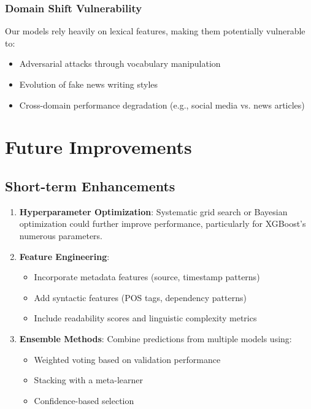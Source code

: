 \documentclass[11pt]{article}
\begin{document}
\subsubsection{Domain Shift Vulnerability}
Our models rely heavily on lexical features, making them potentially vulnerable to:
\begin{itemize}
\item Adversarial attacks through vocabulary manipulation
\item Evolution of fake news writing styles
\item Cross-domain performance degradation (e.g., social media vs. news articles)
\end{itemize}

\section{Future Improvements}

\subsection{Short-term Enhancements}
\begin{enumerate}
\item \textbf{Hyperparameter Optimization}: Systematic grid search or Bayesian optimization could further improve performance, particularly for XGBoost's numerous parameters.

\item \textbf{Feature Engineering}:
   \begin{itemize}
   \item Incorporate metadata features (source, timestamp patterns)
   \item Add syntactic features (POS tags, dependency patterns)
   \item Include readability scores and linguistic complexity metrics
   \end{itemize}

\item \textbf{Ensemble Methods}: Combine predictions from multiple models using:
   \begin{itemize}
   \item Weighted voting based on validation performance
   \item Stacking with a meta-learner
   \item Confidence-based selection
   \end{itemize}
\end{enumerate}
\end{document}
